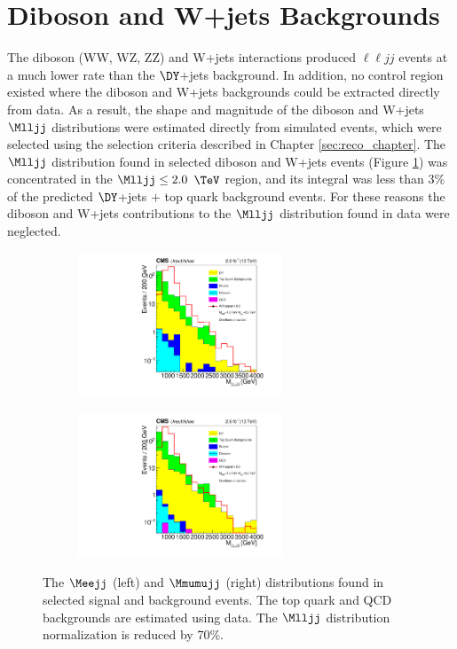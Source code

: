 \section{Diboson and W+jets Backgrounds}
\label{sec:dibosonAndWJetsBkgnds}
The diboson (WW, WZ, ZZ) and W+jets interactions produced $\ell\ell jj$ events at a much lower rate than the $\DY$+jets background.  In 
addition, no control region existed where the diboson and W+jets backgrounds could be extracted directly from data.  As a result, the 
shape and magnitude of the diboson and W+jets $\Mlljj$ distributions were estimated directly from simulated events, which were selected 
using the selection criteria described in Chapter \ref{sec:reco_chapter}.  The $\Mlljj$ distribution found in selected diboson and W+jets 
events (Figure \ref{fig:allExpectedBkgnds}) was concentrated in the $\Mlljj \leq 2.0$ $\TeV$ region, and its integral was less than 3\% 
of the predicted $\DY$+jets $\plus$ top quark background events.  For these reasons the diboson and W+jets contributions to the $\Mlljj$ 
distribution found in data were neglected.

\begin{figure}
	\centering
	\begin{subfigure}[t]{2.4in}
		\centering
		\includegraphics[width=2.4in]{figures/useOfLLJJMassAsFigureOfMerit.pdf}
	\end{subfigure}
	\thickspace
	\begin{subfigure}[t]{2.4in}
		\centering
		\includegraphics[width=2.4in]{figures/Mlljj_mumuChnl_signalRegionNoData.pdf}
	\end{subfigure}
	\caption{The $\Meejj$ (left) and $\Mmumujj$ (right) distributions found in selected signal and background events.  The top 
		quark and QCD backgrounds are estimated using data. The \WR $\Mlljj$ distribution normalization is reduced by 70\%.}
	\label{fig:allExpectedBkgnds}
\end{figure}


